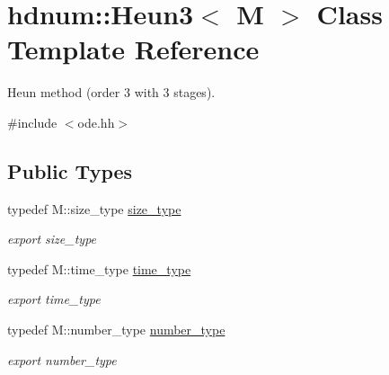 \hypertarget{classhdnum_1_1Heun3}{
\section{hdnum::Heun3$<$ M $>$ Class Template Reference}
\label{classhdnum_1_1Heun3}
}


Heun method (order 3 with 3 stages).  




{\ttfamily \#include $<$ode.hh$>$}

\subsection*{Public Types}
\begin{DoxyCompactItemize}
\item 
\hypertarget{classhdnum_1_1Heun3_a99b9c3470be12f9c3e5e3804e77ec316}{
typedef M::size\_\-type \hyperlink{classhdnum_1_1Heun3_a99b9c3470be12f9c3e5e3804e77ec316}{size\_\-type}}
\label{classhdnum_1_1Heun3_a99b9c3470be12f9c3e5e3804e77ec316}

\begin{DoxyCompactList}\small\item\em export size\_\-type \item\end{DoxyCompactList}\item 
\hypertarget{classhdnum_1_1Heun3_a48fcfee8624c3e7984dc054d641ff962}{
typedef M::time\_\-type \hyperlink{classhdnum_1_1Heun3_a48fcfee8624c3e7984dc054d641ff962}{time\_\-type}}
\label{classhdnum_1_1Heun3_a48fcfee8624c3e7984dc054d641ff962}

\begin{DoxyCompactList}\small\item\em export time\_\-type \item\end{DoxyCompactList}\item 
\hypertarget{classhdnum_1_1Heun3_a4cda69fda9bfa3fb9d2a0ddeca50a29c}{
typedef M::number\_\-type \hyperlink{classhdnum_1_1Heun3_a4cda69fda9bfa3fb9d2a0ddeca50a29c}{number\_\-type}}
\label{classhdnum_1_1Heun3_a4cda69fda9bfa3fb9d2a0ddeca50a29c}

\begin{DoxyCompactList}\small\item\em export number\_\-type \item\end{DoxyCompactList}\end{DoxyCompactItemize}

